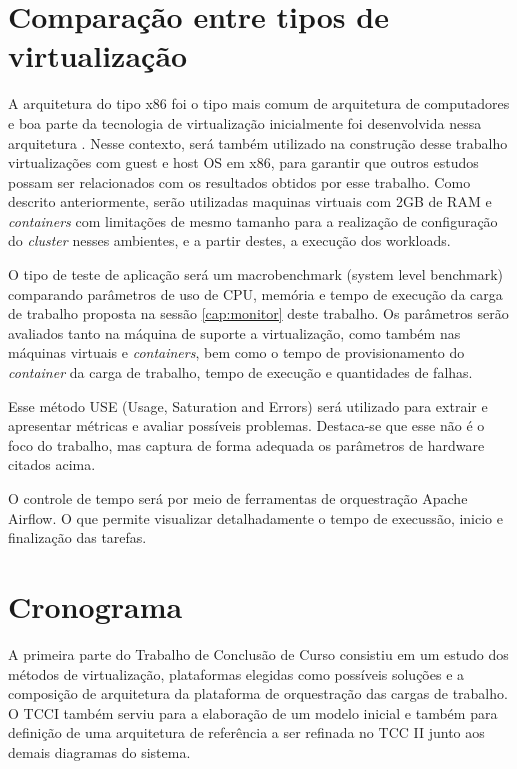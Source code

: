 \section{Comparação entre tipos de virtualização}

A arquitetura do tipo x86 foi o tipo mais comum de arquitetura de computadores e boa parte da tecnologia de virtualização inicialmente foi desenvolvida nessa arquitetura \cite{fayyad_benchmarking_2013}. Nesse contexto, será também utilizado na construção desse trabalho virtualizações com guest e host OS em x86, para garantir que outros estudos possam ser relacionados com os resultados obtidos por esse trabalho.
Como descrito anteriormente, serão utilizadas maquinas virtuais com 2GB de RAM e  \emph{containers} com limitações de mesmo tamanho para a realização de configuração do  \emph{cluster} nesses ambientes, e a partir destes, a execução dos workloads.

O tipo de teste de aplicação será um macrobenchmark (system level benchmark) \cite{huge2008,scheepers2014virtualization} comparando parâmetros de uso de CPU, memória e tempo de execução da carga de trabalho proposta na sessão \ref{cap:monitor} deste trabalho. Os parâmetros serão avaliados tanto na máquina de suporte a virtualização, como também nas máquinas virtuais e  \emph{containers}, bem como o tempo de provisionamento do  \emph{container} da carga de trabalho, tempo de execução e quantidades de falhas.

Esse método USE (Usage, Saturation and Errors) \cite{greg2022} será utilizado para extrair e apresentar métricas e avaliar possíveis problemas. Destaca-se que esse não é o foco do trabalho, mas captura de forma adequada os parâmetros de hardware citados acima.

O controle de tempo será por meio de ferramentas de orquestração {Apache Airflow}\textregistered. O que permite visualizar detalhadamente o tempo de execussão, inicio e finalização das tarefas.

\section{Cronograma}
A primeira parte do Trabalho de Conclusão de Curso consistiu em um estudo dos métodos de virtualização, plataformas elegidas como possíveis soluções e a composição de arquitetura da plataforma de orquestração das cargas de trabalho. O TCCI também serviu para a elaboração de um modelo inicial e também para definição de uma arquitetura de referência a ser refinada no TCC II junto aos demais diagramas do sistema.


